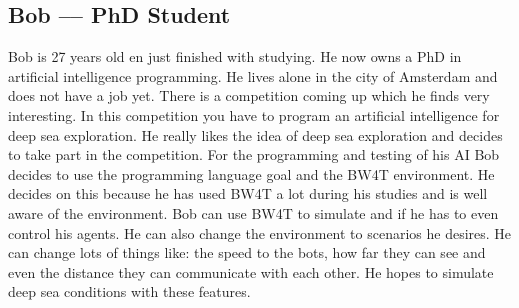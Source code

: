 \subsection{Bob –-- PhD Student}
Bob is 27 years old en just finished with studying. He now owns a PhD in artificial intelligence programming. He lives alone in the city of Amsterdam and does not have a job yet. There is a competition coming up which he finds very interesting. In this competition you have to program an artificial intelligence for deep sea exploration. He really likes the idea of deep sea exploration and decides to take part in the competition. 
For the programming and testing of his AI Bob decides to use the programming language goal and the BW4T environment. He decides on this because he has used BW4T a lot during his studies and is well aware of the environment. Bob can use BW4T to simulate and if he has to even control his agents. He can also change the environment to scenarios he desires. He can change lots of things like: the speed to the bots, how far they can see and even the distance they can communicate with each other. He hopes to simulate deep sea conditions with these features.
 